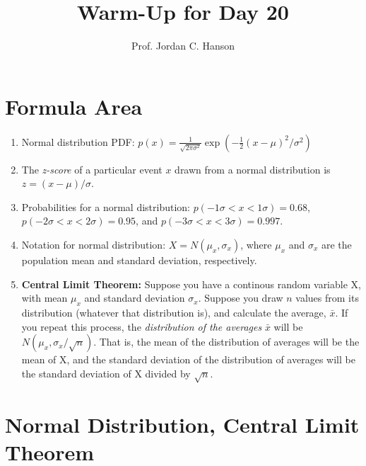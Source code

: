 \documentclass{article}
\begin{document}
\title{Warm-Up for Day 20}
\author{Prof. Jordan C. Hanson}

\maketitle

\section{Formula Area}

\begin{enumerate}
\item Normal distribution PDF: $p(x) = \frac{1}{\sqrt{2\pi \sigma^2}} \exp\left( -\frac{1}{2}(x-\mu)^2/\sigma^2 \right)$
\item The \textit{z-score} of a particular event $x$ drawn from a normal distribution is $z = (x-\mu)/\sigma$.
\item Probabilities for a normal distribution: $p(-1\sigma < x < 1\sigma) = 0.68$, $p(-2\sigma < x < 2\sigma) = 0.95$, and $p(-3\sigma < x < 3\sigma) = 0.997$.
\item Notation for normal distribution: $X = N(\mu_x,\sigma_x)$, where $\mu_x$ and $\sigma_x$ are the population mean and standard deviation, respectively.
\item \textbf{Central Limit Theorem:} Suppose you have a continous random variable X, with mean $\mu_x$ and standard deviation $\sigma_x$.  Suppose you draw $n$ values from its distribution (whatever that distribution is), and calculate the average, $\bar{x}$.  If you repeat this process, the \textit{distribution of the averages} $\bar{x}$ will be $N(\mu_x,\sigma_x/\sqrt{n})$.  That is, the mean of the distribution of averages will be the mean of X, and the standard deviation of the distribution of averages will be the standard deviation of X divided by $\sqrt{n}$.
\end{enumerate}

\section{Normal Distribution, Central Limit Theorem}
\end{document}
